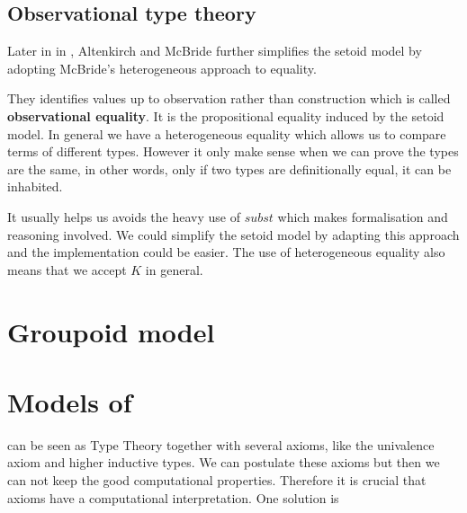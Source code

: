 \subsection{Observational type theory}


Later in in \cite{alti:ott-conf}, Altenkirch and McBride further
simplifies the setoid model by adopting McBride's heterogeneous
approach to equality. 

They identifies values up to observation rather than construction which is called \textbf{observational equality}. It is the propositional equality induced by the setoid model.  In general we have a heterogeneous equality which allows us to compare terms of different types. However it only make sense when we can prove the types are the same, in other words, only if two types are definitionally equal, it can be inhabited. 

It usually helps us avoids the heavy use of $subst$ which makes formalisation and reasoning involved. We could simplify the setoid model by adapting this approach and the implementation could be easier. The use of heterogeneous equality also means that we accept $K$ in general.











\section{Groupoid model}




\section{Models of \hott}




\cite{bezem2013model}

\hott can be seen as Type Theory together with several axioms, like the univalence axiom and higher inductive types. We can postulate these axioms but then we can not keep the good computational properties. Therefore it is crucial that axioms have a computational interpretation. One solution is 









